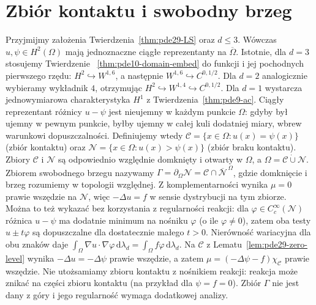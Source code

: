 \section{Zbiór kontaktu i swobodny brzeg}
Przyjmijmy założenia Twierdzenia~\ref{thm:pde29-LS}
oraz $d\le3$. Wówczas $u,\psi\in H^2(\Omega)$
mają jednoznaczne ciągłe reprezentanty na $\overline\Omega$.
Istotnie, dla $d=3$ stosujemy Twierdzenie
~\ref{thm:pde10-domain-embed} do funkcji i jej pochodnych
pierwszego rzędu: $H^2\hookrightarrow W^{1,6}$,
a następnie $W^{1,6}\hookrightarrow C^{0,1/2}$.
Dla $d=2$ analogicznie wybieramy wykładnik $4$,
otrzymując $H^2\hookrightarrow W^{1,4}\hookrightarrow C^{0,1/2}$.
Dla $d=1$ wystarcza jednowymiarowa charakterystyka
$H^1$ z Twierdzenia~\ref{thm:pde9-ac}.
Ciągły reprezentant różnicy $u-\psi$ jest nieujemny
w każdym punkcie $\Omega$: gdyby był ujemny w pewnym
punkcie, byłby ujemny w całej kuli dodatniej miary,
wbrew warunkowi dopuszczalności.
Definiujemy wtedy
$\mathcal C=\{x\in\Omega:u(x)=\psi(x)\}$ (zbiór kontaktu)
oraz $\mathcal N=\{x\in\Omega:u(x)>\psi(x)\}$ (zbiór braku kontaktu).
Zbiory $\mathcal C$ i $\mathcal N$ są odpowiednio
względnie domknięty i otwarty w $\Omega$, a
$\Omega=\mathcal C\mathbin{\dot\cup}\mathcal N$.
Zbiorem swobodnego brzegu nazywamy
$\Gamma=\partial_\Omega\mathcal N
=\mathcal C\cap\overline{\mathcal N}^{\,\Omega}$,
gdzie domknięcie i brzeg rozumiemy w topologii względnej.
Z komplementarności wynika $\mu=0$ prawie wszędzie
na $\mathcal N$, więc $-\Delta u=f$ w sensie
dystrybucji na tym zbiorze. Można to też wykazać
bez korzystania z regularności reakcji: dla
$\varphi\in C_c^\infty(\mathcal N)$ różnica
$u-\psi$ ma dodatnie minimum na nośniku $\varphi$
(o ile $\varphi\ne0$), zatem oba testy
$u\pm t\varphi$ są dopuszczalne dla dostatecznie małego
$t>0$. Nierówność wariacyjna dla obu znaków
daje $\int_\Omega\nabla u\cdot\nabla\varphi\,
\mathrm d\lambda_d=\int_\Omega f\varphi\,\mathrm d\lambda_d$.
Na $\mathcal C$ z Lematu~\ref{lem:pde29-zero-level}
wynika $-\Delta u=-\Delta\psi$ prawie wszędzie,
a zatem $\mu=(-\Delta\psi-f)\chi_{\mathcal C}$
prawie wszędzie. Nie utożsamiamy zbioru kontaktu
z nośnikiem reakcji: reakcja może znikać na części
zbioru kontaktu (na przykład dla $\psi=f=0$). Zbiór $\Gamma$ nie jest dany
z góry i jego regularność wymaga dodatkowej analizy.

